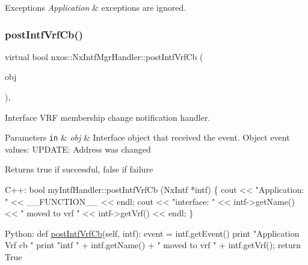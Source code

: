 \begin{DoxyExceptions}{Exceptions}
{\em Application} & exceptions are ignored. \\
\hline
\end{DoxyExceptions}
\mbox{\label{classnxos_1_1_nx_intf_mgr_handler_aa6f8bc5b1cfa6d99e863c8ede3cafa5f}} 
\subsubsection{\texorpdfstring{post\+Intf\+Vrf\+Cb()}{postIntfVrfCb()}}
{\footnotesize\ttfamily virtual bool nxos\+::\+Nx\+Intf\+Mgr\+Handler\+::post\+Intf\+Vrf\+Cb (\begin{DoxyParamCaption}\item[{\mbox{\hyperlink{classnxos_1_1_nx_intf}{Nx\+Intf}} $\ast$}]{obj }\end{DoxyParamCaption})\hspace{0.3cm}{\ttfamily [inline]}, {\ttfamily [virtual]}}

Interface V\+RF membership change notification handler. 
\begin{DoxyParams}[1]{Parameters}
\mbox{\tt in}  & {\em obj} & Interface object that received the event. Object event values\+: U\+P\+D\+A\+TE\+: Address was changed \\
\hline
\end{DoxyParams}
\begin{DoxyReturn}{Returns}
true if successful, false if failure
\end{DoxyReturn}

\begin{DoxyCode}
C++:
    \textcolor{keywordtype}{bool}  myIntfHandler::postIntfVrfCb (NxIntf *intf)
    \{
        cout << \textcolor{stringliteral}{"Application: "} << \_\_FUNCTION\_\_ << endl;
        cout << \textcolor{stringliteral}{"interface: "} << intf->getName() << 
             \textcolor{stringliteral}{" moved to vrf "} <<  intf->getVrf() << endl;
    \}

Python:   
    def \mbox{\hyperlink{classnxos_1_1_nx_intf_mgr_handler_aa6f8bc5b1cfa6d99e863c8ede3cafa5f}{postIntfVrfCb}}(\textcolor{keyword}{self}, intf):
        event = intf.getEvent()
        print \textcolor{stringliteral}{"Application Vrf cb "} 
        print \textcolor{stringliteral}{"intf "} + intf.getName() + \textcolor{stringliteral}{" moved to vrf "} 
                + intf.getVrf();
        \textcolor{keywordflow}{return} True
\end{DoxyCode}



